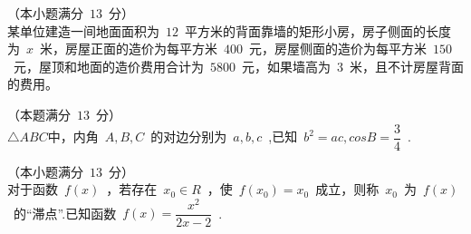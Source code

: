 \documentclass{BHCexam}
\begin{document}
\begin{questions}
\vspace{8cm}
\question （本小题满分~$13$~分）\\
某单位建造一间地面面积为~$12$~平方米的背面靠墙的矩形小房，房子侧面的长度为~$x$~米，房屋正面的造价为每平方米~$400$~元，房屋侧面的造价为每平方米~$150$~元，屋顶和地面的造价费用合计为~$5800$~元，如果墙高为~$3$~米，且不计房屋背面的费用。
\vspace{9cm}
\question （本题满分~$13$~分）\\
$\triangle ABC$中，内角~$A,B,C$~的对边分别为~$a,b,c$~,已知~$b^2=ac,cosB=\dfrac{3}{4}$~.
\vspace{9cm}
\question （本小题满分~$13$~分）\\
对于函数~$f(x)$~，若存在~$x_0\in R$~，使~$f(x_0)=x_0$~成立，则称~$x_0$~为~$f(x)$~的“滞点”.已知函数~$f(x)=\dfrac{x^2}{2x-2}$~.
\end{questions}
\end{document}
